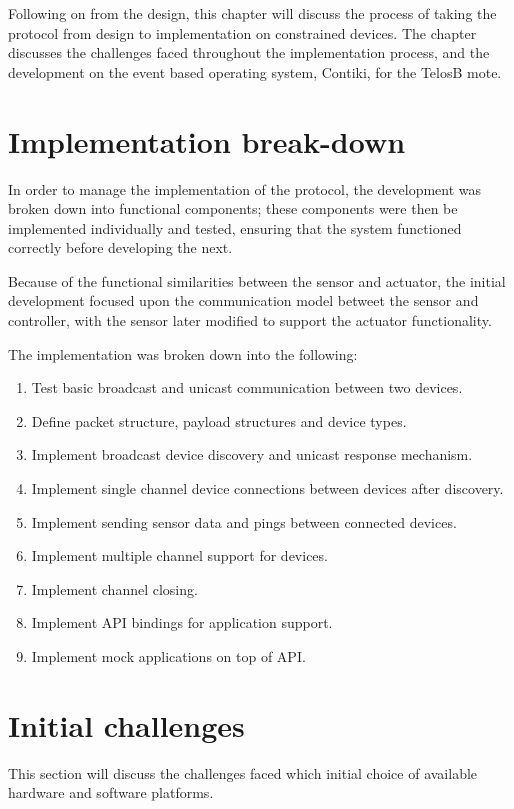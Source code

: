 Following on from the design, this chapter will discuss the process of taking the protocol from design to implementation on constrained devices. The chapter discusses the challenges faced throughout the implementation process, and the development on the event based operating system, Contiki, for the TelosB mote. 


\section{Implementation break-down} %
\label{sec:implementation_break_down}
In order to manage the implementation of the protocol, the development was broken down into functional components; these components were then be implemented individually and tested, ensuring that the system functioned correctly before developing the next.

Because of the functional similarities between the sensor and actuator, the initial development focused upon the communication model betweet the sensor and controller, with the sensor later modified to support the actuator functionality.

The implementation was broken down into the following:
\vspace{-5mm} 
\begin{enumerate}
	\item Test basic broadcast and unicast communication between two devices.
	\item Define packet structure, payload structures and device types.
	\item Implement broadcast device discovery and unicast response mechanism.
	\item Implement single channel device connections between devices after discovery.
	\item Implement sending sensor data and pings between connected devices.
	\item Implement multiple channel support for devices.
	\item Implement channel closing.
	\item Implement API bindings for application support.
	\item Implement mock applications on top of API.
\end{enumerate}


\section{Initial challenges} %
\label{sec:initial_challenges}
This section will discuss the challenges faced which initial choice of available hardware and software platforms.
